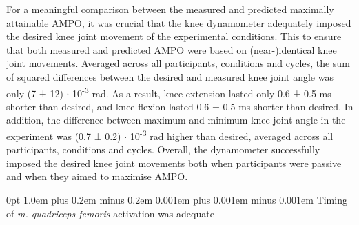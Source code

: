 \documentclass[
  11pt,
  a4paper]{article}
\makeatletter
\renewcommand{\subsection}{%
  \@startsection{subsection}{2}
    {0pt} 					%
    {1.0em plus 0.2em minus 0.2em} 	%
    {0.001em plus 0.001em minus 0.001em}    	%
    {\large\bfseries\sffamily}%
}
\makeatother
\begin{document}
For a meaningful comparison between the measured and predicted maximally
attainable AMPO, it was crucial that the knee dynamometer adequately
imposed the desired knee joint movement of the experimental conditions.
This to ensure that both measured and predicted AMPO were based on
(near-)identical knee joint movements. Averaged across all participants,
conditions and cycles, the sum of squared differences between the
desired and measured knee joint angle was only (7 ± 12) \(\cdot\)
10\textsuperscript{-3} rad. As a result, knee extension lasted only 0.6
± 0.5 ms shorter than desired, and knee flexion lasted 0.6 ± 0.5 ms
shorter than desired. In addition, the difference between maximum and
minimum knee joint angle in the experiment was (0.7 ± 0.2) \(\cdot\)
10\textsuperscript{-3} rad higher than desired, averaged across all
participants, conditions and cycles. Overall, the dynamometer
successfully imposed the desired knee joint movements both when
participants were passive and when they aimed to maximise AMPO.

\subsection{\texorpdfstring{Timing of \emph{m. quadriceps femoris}
activation was
adequate}{Timing of m. quadriceps femoris activation was adequate}}\label{timing-of-m.-quadriceps-femoris-activation-was-adequate}
\end{document}

